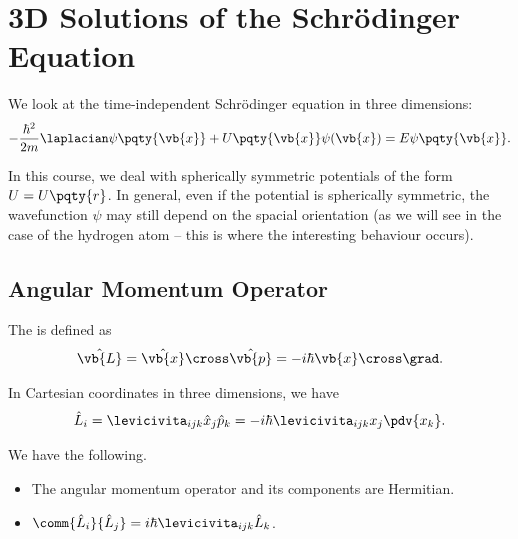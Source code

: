 \section{3D Solutions of the Schr\"{o}dinger Equation}

We look at the time-independent Schr\"{o}dinger equation in three dimensions:
\begin{equation}
 -\frac{\hbar^2}{2m}\laplacian\psi\pqty{\vb{x}} + U\pqty{\vb{x}}\psi(\vb{x}) = E\psi\pqty{\vb{x}}.
\end{equation}

In this course, we deal with spherically symmetric potentials of the form \(U = U\pqty{r}\). In general, even if the potential is spherically symmetric, the wavefunction \(\psi\) may still depend on the spacial orientation (as we will see in the case of the hydrogen atom -- this is where the interesting behaviour occurs).

\subsection{Angular Momentum Operator}

\begin{definition}
    The  is defined as
    \begin{equation}
        \hat{\vb{L}} = \hat{\vb{x}} \cross \hat{\vb{p}} = -i \hbar \vb{x} \cross \grad.
    \end{equation}
\end{definition}

In Cartesian coordinates in three dimensions, we have
\begin{equation}
    \hat{L}_i = \levicivita_{ijk} \hat{x}_j \hat{p}_k =  - i \hbar \levicivita_{ijk} x_j \pdv{x_k}.
\end{equation}

\begin{proposition}
    We have the following.

    \begin{itemize}
        \item The angular momentum operator and its components are Hermitian.
        \item \(\comm{\hat{L}_i}{\hat{L}_j} = i\hbar \levicivita_{ijk} \hat{L}_k\).
    \end{itemize}
\end{proposition}

